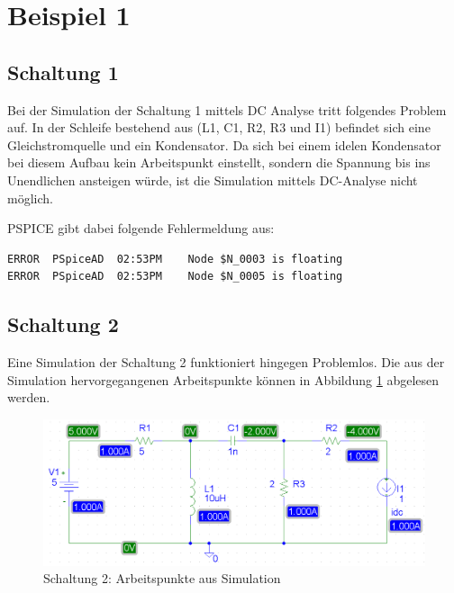 

\section{Beispiel 1}

\subsection{Schaltung 1}

Bei der Simulation der Schaltung 1 mittels DC Analyse tritt folgendes Problem auf. In der 
Schleife bestehend aus (L1, C1, R2, R3 und I1) befindet sich eine Gleichstromquelle und ein Kondensator.
Da sich bei einem idelen Kondensator bei diesem Aufbau kein Arbeitspunkt einstellt, sondern die Spannung
bis ins Unendlichen ansteigen würde, ist die Simulation mittels DC-Analyse nicht möglich.

PSPICE gibt dabei folgende Fehlermeldung aus:

\begin{verbatim}
ERROR  PSpiceAD  02:53PM    Node $N_0003 is floating
ERROR  PSpiceAD  02:53PM    Node $N_0005 is floating
\end{verbatim}


\subsection{Schaltung 2}

Eine Simulation der Schaltung 2 funktioniert hingegen Problemlos. Die aus der Simulation hervorgegangenen
Arbeitspunkte können in Abbildung \ref{fig:schalt2_ap} abgelesen werden.


\begin{figure}[h!]
 \centering
 \includegraphics[width=16cm,keepaspectratio=true]{./fig/schalt2_ap.png}
 \caption{Schaltung 2: Arbeitspunkte aus Simulation}
 \label{fig:schalt2_ap}
\end{figure}


